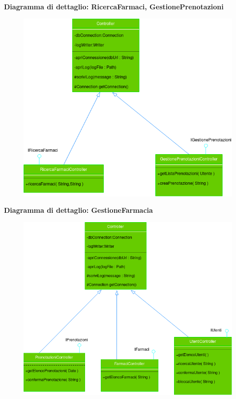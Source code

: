 \textbf{Diagramma di dettaglio: RicercaFarmaci, GestionePrenotazioni}
\begin{figure}[h!]
    \begin{center}
        \includegraphics[width=\textwidth]{immagini/ControllerCliente-progettazione.png}
    \end{center}
\end{figure}

\newpage

\textbf{Diagramma di dettaglio: GestioneFarmacia}
\begin{figure}[h!]
    \begin{center}
        \includegraphics[width=\textwidth]{immagini/ControllerFarmacia-progettazione.png}
    \end{center}
\end{figure}

